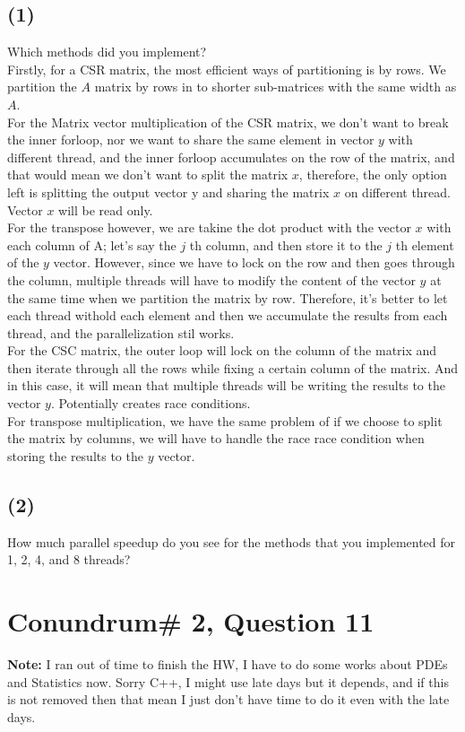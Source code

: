\documentclass[]{article}
\begin{document}
    \subsection*{(1)}
        Which methods did you implement?
        \\[1.1em]
        Firstly, for a CSR matrix, the most efficient ways of partitioning is by rows. We partition the $A$ matrix by rows in to shorter sub-matrices with the same width as $A$. 
        \\
        For the Matrix vector multiplication of the CSR matrix, we don't want to break the inner forloop, nor we want to share the same element in vector $y$ with different thread, and the inner forloop accumulates on the row of the matrix, and that would mean we don't want to split the matrix $x$, therefore, the only option left is splitting the output vector y and sharing the matrix $x$ on different thread. Vector $x$ will be read only. 
        \\
        For the transpose however, we are takine the dot product with the vector $x$ with each column of A; let's say the $j$ th column, and then store it to the $j$ th element of the $y$ vector. However, since we have to lock on the row and then goes through the column, multiple threads will have to modify the content of the vector $y$ at the same time when we partition the matrix by row. Therefore, it's better to let each thread withold each element and then we accumulate the results from each thread, and the parallelization stil works.  
        \\[1.1em]
        For the CSC matrix, the outer loop will lock on the column of the matrix and then iterate through all the rows while fixing a certain column of the matrix. And in this case, it will mean that multiple threads will be writing the results to the vector $y$. Potentially creates race conditions. 
        \\
        For transpose multiplication, we have the same problem of if we choose  to split the matrix by columns, we will have to handle the race race condition when storing the results to the $y$ vector. 
 
    \subsection*{(2)}
        How much parallel speedup do you see for the methods that you implemented for 1, 2, 4, and 8 threads?

        

\section*{Conundrum\# 2, Question 11}
    \textbf{Note: }I ran out of time to finish the HW, I have to do some works about PDEs and Statistics now. Sorry C++, I might use late days but it depends, and if this is not removed then that mean I just don't have time to do it even with the late days. 
\end{document}
